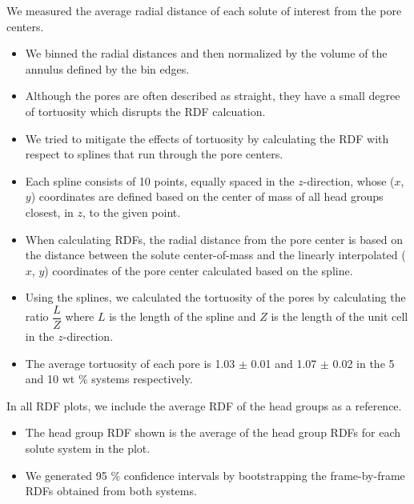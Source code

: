 \documentclass{article}
\begin{document}
  We measured the average radial distance of each solute of interest from the pore
  centers.
  \begin{itemize}
	\item We binned the radial distances and then normalized by the volume
	of the annulus defined by the bin edges.
	\item Although the pores are often described as straight, they have a
	small degree of tortuosity which disrupts the RDF calcuation.
	\item We tried to mitigate the effects of tortuosity by calculating the RDF
	with respect to splines that run through the pore centers.
	\item Each spline consists of 10 points, equally spaced in the $z$-direction, whose
    ($x$, $y$) coordinates are defined based on the center of mass of all head
    groups closest, in $z$, to the given point.
	\item When calculating RDFs, the radial distance from the pore center
	is based on the distance between the solute center-of-mass and the linearly
	interpolated ($x$, $y$)	coordinates of the pore center calculated based
	on the spline.
	\item Using the splines, we calculated the tortuosity of the 
	pores by calculating the ratio $\dfrac{L}{Z}$ where $L$ is the length of the spline and $Z$ is 
    the length of the unit cell in the $z$-direction. 
    \item The average tortuosity of each pore is 1.03 $\pm$ 0.01 and 1.07 $\pm$ 0.02 in the 
    5 and 10 wt \% systems respectively. 
  \end{itemize}
  
  In all RDF plots, we include the average RDF of the head groups as a reference.
  \begin{itemize}
    \item The head group RDF shown is the average of the head group RDFs for each
    solute system in the plot.
    \item We generated 95 \% confidence intervals by bootstrapping the frame-by-frame
    RDFs obtained from both systems.
  \end{itemize}
  
\end{document}
